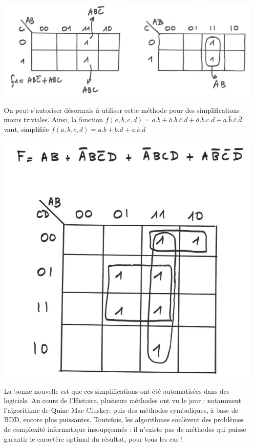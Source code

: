\begin{center}
\includegraphics[scale=0.2]{./figures/karnaugh_00.png}
\end{center}

On peut s'autoriser désormais à utiliser cette méthode pour des simplifications moins triviales.
Ainsi, la fonction $f(a,b,c,d)=a.b+\overline{a}.b.\overline{c}.d+\overline{a}.b.c.d + a.\overline{b}.\overline{c}.\overline{d}$ vaut,
simplifiée $f(a,b,c,d)=a.b+b.d+a.\overline{c}.\overline{d}$
\begin{center}
\includegraphics[scale=0.2]{./figures/karnaugh_01.png}
\end{center}


La bonne nouvelle est que ces simplifications ont été automatisées dans des logiciels.
Au cours de l'Histoire, plusieurs méthodes ont vu le jour : notamment l'algorithme de Quine Mac Cluskey, puis des méthodes symboliques, à base de BDD, encore plus puissantes.
Toutefois, les algorithmes soulèvent des problèmes de
complexité informatique insoupçonnés : il n'existe pas de méthodes qui puisse garantir le caractère optimal du résultat, pour tous les cas !

